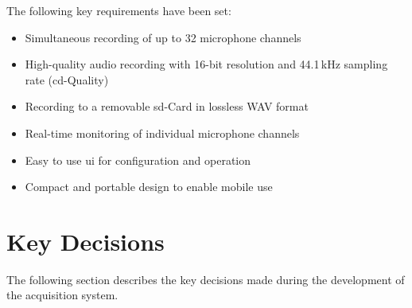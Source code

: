 The following key requirements have been set:
\begin{itemize}
	\item Simultaneous recording of up to 32 microphone channels
	\item High-quality audio recording with 16-bit resolution and 44.1\,kHz sampling rate (\acrshort{cd}-Quality)
	\item Recording to a removable \acrshort{sd}-Card in lossless WAV format
	\item Real-time monitoring of individual microphone channels
	\item Easy to use \acrshort{ui} for configuration and operation
	\item Compact and portable design to enable mobile use
\end{itemize}

\section{Key Decisions}
The following section describes the key decisions made during the development of the acquisition system.

